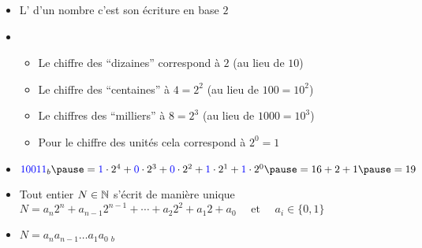 \begin{frame}


\pause\pause\pause\pause\pause\pause\pause\pause\pause\pause

\vspace*{-1ex}
\pause

\begin{itemize}
  \item L' d'un nombre c'est son écriture en base $2$
\pause
  \item 
  \begin{itemize}
    \item Le chiffre des ``dizaines'' correspond à $2$ (au lieu de $10$)
    \item Le chiffre des ``centaines'' à $4=2^2$ (au lieu de $100=10^2$)
    \item Le chiffres des ``milliers'' à $8=2^3$ (au lieu de $1000=10^3$)
    \item Pour le chiffre des unités cela correspond à $2^0 = 1$  
  \end{itemize}

\pause  

  \item ${\color{blue}10011}_b 
  \pause 
  = {\color{blue}1} \cdot 2^4 + {\color{blue}0} \cdot 2^3 + 
  {\color{blue}0} \cdot 2^2 + {\color{blue}1}\cdot 2^1 + {\color{blue}1}\cdot 2^0 
  \pause
  = 16+2+1
  \pause
  =19$
 
\pause
  \item Tout entier $N\in \mathbb{N}$ s'écrit de manière unique 
$N= a_n 2^n+ a_{n-1}2^{n-1}+\cdots + a_2 2^2 + a_1 2 + a_0 \quad \text{ et } \quad a_i \in \{0,1\}$
\pause
  \item $N= a_n a_{n-1}\ldots a_1 a_0 \ _b$

\end{itemize}
\end{frame}


